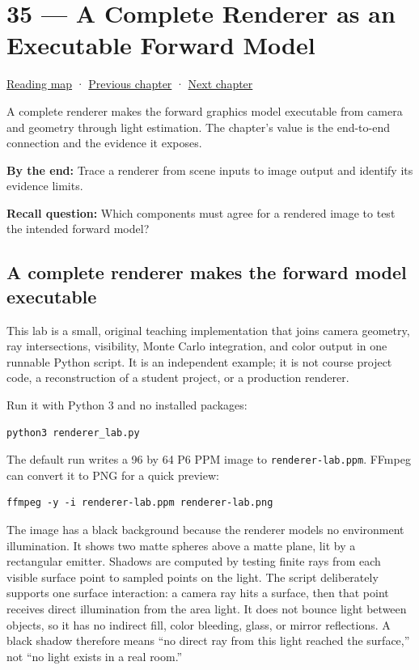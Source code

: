 \hypertarget{04-visual-computing-ii-ch035}{}
\section{35 --- A Complete Renderer as an Executable Forward Model}\label{a-complete-renderer-as-an-executable-forward-model}

\href{Chapter\%20Edition/02\%20-\%20Graphics\%20Vision\%20and\%20XR/00\%20-\%20Reading\%20Map}{Reading map} · \hyperref[04-visual-computing-ii-ch034]{Previous chapter} · \hyperref[04-visual-computing-ii-ch036]{Next chapter}

A complete renderer makes the forward graphics model executable from camera and geometry through light estimation. The chapter's value is the end-to-end connection and the evidence it exposes.

\textbf{By the end:} Trace a renderer from scene inputs to image output and identify its evidence limits.

\textbf{Recall question:} Which components must agree for a rendered image to test the intended forward model?

\subsection{A complete renderer makes the forward model executable}\label{a-complete-renderer-makes-the-forward-model-executable}

This lab is a small, original teaching implementation that joins camera geometry, ray intersections, visibility, Monte Carlo integration, and color output in one runnable Python script. It is an independent example; it is not course project code, a reconstruction of a student project, or a production renderer.

Run it with Python 3 and no installed packages:

\begin{verbatim}
python3 renderer_lab.py
\end{verbatim}

The default run writes a 96 by 64 P6 PPM image to \texttt{renderer-lab.ppm}. FFmpeg can convert it to PNG for a quick preview:

\begin{verbatim}
ffmpeg -y -i renderer-lab.ppm renderer-lab.png
\end{verbatim}

The image has a black background because the renderer models no environment illumination. It shows two matte spheres above a matte plane, lit by a rectangular emitter. Shadows are computed by testing finite rays from each visible surface point to sampled points on the light. The script deliberately supports one surface interaction: a camera ray hits a surface, then that point receives direct illumination from the area light. It does not bounce light between objects, so it has no indirect fill, color bleeding, glass, or mirror reflections. A black shadow therefore means ``no direct ray from this light reached the surface,'' not ``no light exists in a real room.''

